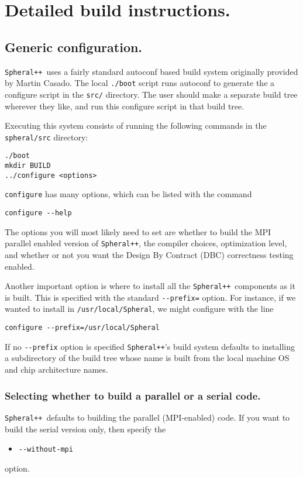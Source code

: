 \documentclass{article}
\newcommand{\Spheral}{{\tt Spheral++}}
\begin{document}
\section{Detailed build instructions.}

\subsection{Generic configuration.}
\Spheral\ uses a fairly standard autoconf based build system originally provided
by Martin Casado.  The local {\tt ./boot} script runs autoconf to generate the
a configure script in the {\tt src/} directory.  The user should make a separate
build tree wherever they like, and run this configure script in that build
tree.

Executing this system consists of running the following commands in the {\tt
  spheral/src} directory:
\begin{verbatim}
./boot
mkdir BUILD
../configure <options>
\end{verbatim}
{\tt configure} has many options, which can be listed with the command
\begin{verbatim}
configure --help
\end{verbatim}
The options you will most likely need to set are whether to build the MPI
parallel enabled version of \Spheral, the compiler choices, optimization level,
and whether or not you want the Design By Contract (DBC) correctness testing
enabled.

Another important option is where to install all the \Spheral\ components as it
is built.  This is specified with the standard \verb.--prefix=. option.  For
instance, if we wanted to install in {\tt /usr/local/Spheral}, we might
configure with the line
\begin{verbatim}
configure --prefix=/usr/local/Spheral
\end{verbatim}
If no \verb.--prefix. option is specified \Spheral's build system defaults to
installing a subdirectory of the build tree whose name is built from the local
machine OS and chip architecture names.

\subsubsection{Selecting whether to build a parallel or a serial code.}
\Spheral\ defaults to building the parallel (MPI-enabled) code.  If you want to
build the serial version only, then specify the
\begin{itemize}
\item\verb+--without-mpi+
\end{itemize}
option.
\end{document}
